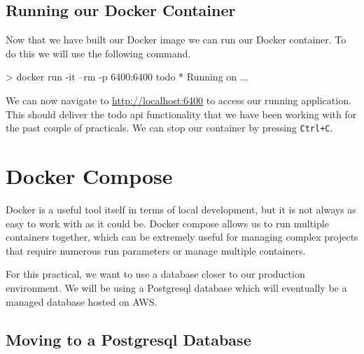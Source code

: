 \documentclass{csse4400}
\begin{document}
\subsection{Running our Docker Container}

Now that we have built our Docker image we can run our Docker container.
To do this we will use the following command.

\begin{code}[language=bash,numbers=none]{}
> docker run -it --rm -p 6400:6400 todo
* Running on ...
\end{code}

We can now navigate to \url{http://localhost:6400} to access our running application.
This should deliver the todo api functionality that we have been working with for the past couple of practicals.
We can stop our container by pressing \texttt{Ctrl+C}.




\section{Docker Compose}

Docker is a useful tool itself in terms of local development,
but it is not always as easy to work with as it could be.
Docker compose allows us to run multiple containers together,
which can be extremely useful for managing complex projects that require numerous run parameters or manage multiple containers.

For this practical, we want to use a database closer to our production environment.
We will be using a Postgresql database which will eventually be a managed database hosted on AWS.

\subsection{Moving to a Postgresql Database}
\end{document}
